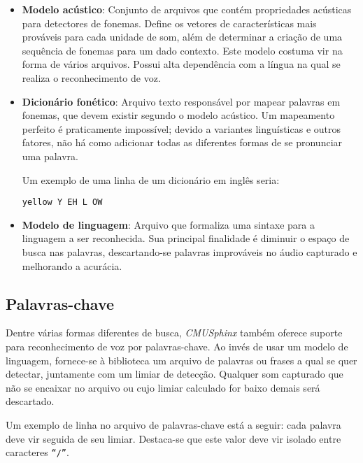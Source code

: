 \begin{itemize}
\item \textbf{Modelo acústico}: Conjunto de arquivos que contém propriedades acústicas para detectores de fonemas. Define os vetores de características mais prováveis para cada unidade de som, além de determinar a criação de uma sequência de fonemas para um dado contexto. Este modelo costuma vir na forma de vários arquivos. Possui alta dependência com a língua na qual se realiza o reconhecimento de voz.

\item \textbf{Dicionário fonético}: Arquivo texto responsável por mapear palavras em fonemas, que devem existir segundo o modelo acústico. Um mapeamento perfeito é praticamente impossível; devido a variantes linguísticas e outros fatores, não há como adicionar todas as diferentes formas de se pronunciar uma palavra.

Um exemplo de uma linha de um dicionário em inglês seria:

\begin{center}
\texttt{yellow Y EH L OW}
\end{center}

\item \textbf{Modelo de linguagem}: Arquivo que formaliza uma sintaxe para a linguagem a ser reconhecida. Sua principal finalidade é diminuir o espaço de busca nas palavras, descartando-se palavras improváveis no áudio capturado e melhorando a acurácia.
\end{itemize}


\subsection{Palavras-chave}

Dentre várias formas diferentes de busca, \textit{CMUSphinx} também oferece suporte para reconhecimento de voz por palavras-chave. Ao invés de usar um modelo de linguagem, fornece-se à biblioteca um arquivo de palavras ou frases a qual se quer detectar, juntamente com um limiar de detecção. Qualquer som capturado que não se encaixar no arquivo ou cujo limiar calculado for baixo demais será descartado.

Um exemplo de linha no arquivo de palavras-chave está a seguir: cada palavra deve vir seguida de seu limiar. Destaca-se que este valor deve vir isolado entre caracteres \texttt{``/''}.

